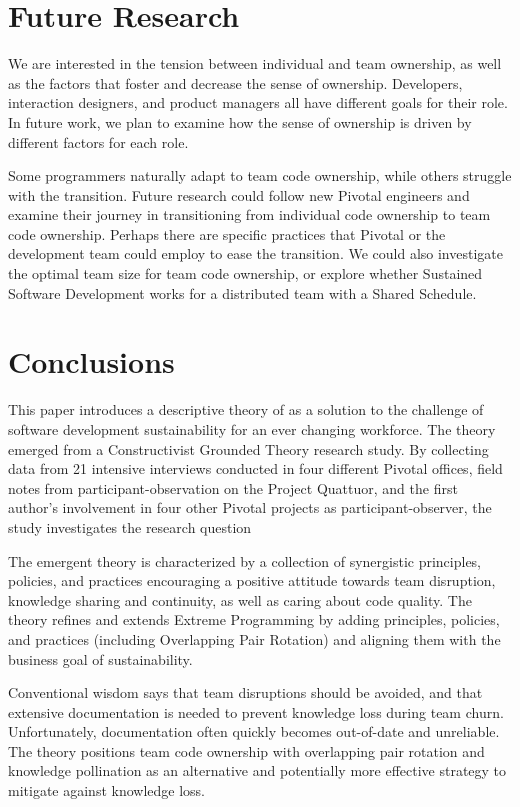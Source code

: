 \section{Future Research}
We are interested in the tension between individual and team ownership, as well as the factors that foster and decrease the sense of ownership. Developers, interaction designers, and product managers all have different goals for their role. In future work, we plan to examine how the sense of ownership is driven by different factors for each role.

Some programmers naturally adapt to team code ownership, while others struggle with the transition. Future research could follow new Pivotal engineers and examine their journey in transitioning from individual code ownership to team code ownership. Perhaps there are 
specific practices that Pivotal or the development team could employ to ease the transition. We could also investigate the optimal team size for team code ownership, or explore whether Sustained Software Development works for a distributed team with a Shared Schedule.
\section{Conclusions}
This paper introduces a descriptive theory of  as a solution to the challenge of software development sustainability for an ever changing workforce. The theory emerged from a Constructivist Grounded Theory research study. By collecting data from 21 intensive interviews conducted in four different Pivotal offices, field notes from participant-observation on the Project Quattuor, and the first author's involvement in four other Pivotal projects as participant-observer, the study investigates the research question 

The emergent theory is characterized by a collection of synergistic principles, policies, and practices encouraging a positive attitude towards team disruption, knowledge sharing and continuity, as well as caring about code quality. The theory refines and extends Extreme Programming by adding principles, policies, and practices (including Overlapping Pair Rotation) and aligning them with the business goal of sustainability.

Conventional wisdom says that team disruptions should be avoided, and that extensive documentation is needed to prevent knowledge loss during team churn. Unfortunately, documentation often quickly becomes out-of-date and unreliable. The theory positions team code ownership with overlapping pair rotation and knowledge pollination as an alternative and potentially more effective strategy to mitigate against knowledge loss.


